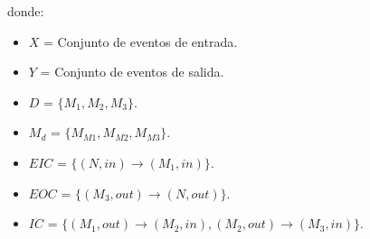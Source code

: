 \noindent donde:

\begin{itemize}
\item $X$ = Conjunto de eventos de entrada.	
\item $Y$ = Conjunto de eventos de salida.
\item $D$ = $\{ M_{1},M_{2},M_{3} \}$.
\item $M_{d}$ = $\{ M_{M1},M_{M2},M_{M3} \}$.
\item $EIC$ = $\{ (N,in) \rightarrow (M_{1},in) \}$.
\item $EOC$ = $\{ (M_{3},out) \rightarrow (N,out) \}$.
\item $IC$ = $\{ (M_{1},out) \rightarrow (M_{2},in),(M_{2},out) \rightarrow (M_{3},in) \}$.
\end{itemize}






